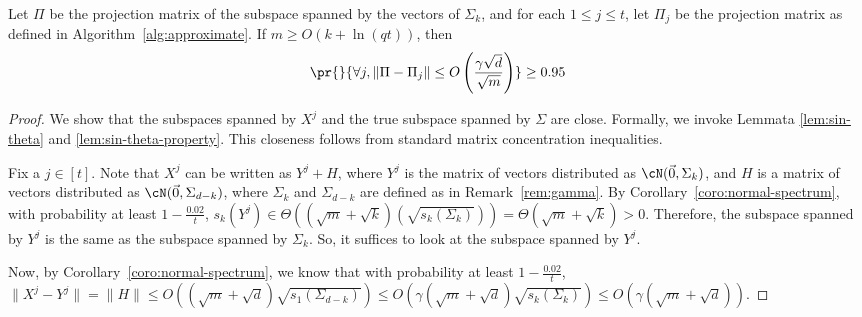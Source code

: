 \begin{lemma}\label{lem:empirical-subspaces-close}
    Let $\Pi$ be the projection matrix of the subspace
    spanned by the vectors of $\Sigma_k$, and for each
    $1 \leq j \leq t$, let $\Pi_j$ be the projection
    matrix as defined in Algorithm~\ref{alg:approximate}.
    If $m \geq O(k + \ln(qt))$, then
    $$\pr{}{\forall j, \|\Pi-\Pi_j\| \leq
        O\left(\frac{\gamma\sqrt{d}}{\sqrt{m}}\right)} \geq 0.95$$
\end{lemma}
\begin{proof}
    We show that the subspaces spanned by $X^j$ and
    the true subspace spanned by $\Sigma$ are close.
    Formally, we invoke
    Lemmata \ref{lem:sin-theta} and \ref{lem:sin-theta-property}.
    This closeness follows from standard matrix concentration
    inequalities.
    
    Fix a $j \in [t]$. Note that $X^j$ can be written
    as $Y^j + H$, where $Y^j$ is the matrix of vectors
    distributed as $\cN(\vec{0},\Sigma_k)$, and $H$ is
    a matrix of vectors distributed as $\cN(\vec{0},\Sigma_{d-k})$,
    where $\Sigma_k$ and $\Sigma_{d-k}$ are defined as
    in Remark~\ref{rem:gamma}.
    By Corollary~\ref{coro:normal-spectrum}, with probability at least $1-\tfrac{0.02}{t}$,
    $s_k(Y^j) \in \Theta((\sqrt{m}+\sqrt{k})(\sqrt{s_k(\Sigma_k)})) = \Theta(\sqrt{m}+\sqrt{k})> 0$.
    Therefore, the subspace spanned by
    $Y^j$ is the same as the subspace spanned by $\Sigma_k$.
    So, it suffices to look at the subspace spanned
    by $Y^j$.

    Now, by Corollary~\ref{coro:normal-spectrum}, we know
    that with probability at least $1-\tfrac{0.02}{t}$,
    $\|X^j-Y^j\| = \|H\| \leq O((\sqrt{m}+{\sqrt{d}})\sqrt{s_1(\Sigma_{d-k})})
    \leq O(\gamma(\sqrt{m}+\sqrt{d})\sqrt{s_k(\Sigma_k)}) \leq O(\gamma(\sqrt{m}+\sqrt{d}))$.
    

\end{proof}
